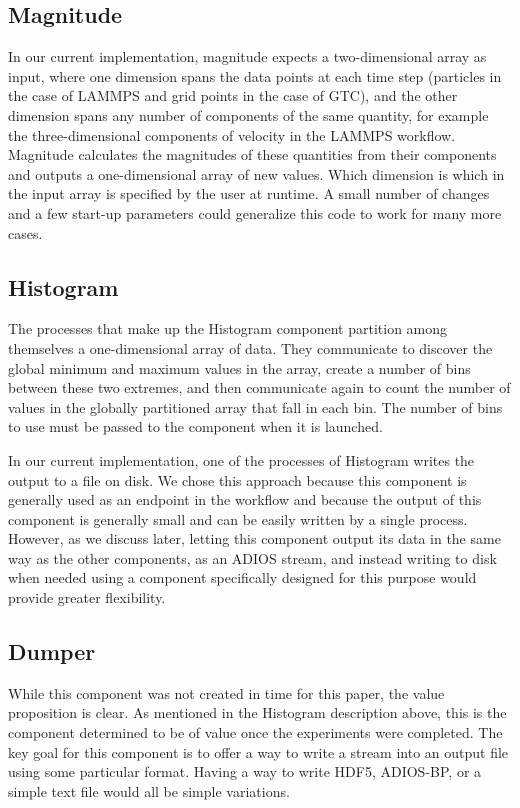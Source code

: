 \documentclass[conference]{IEEEtran}
\begin{document}
\subsection{Magnitude}

In our current implementation, magnitude expects a two-dimensional array as
input, where one dimension spans the data points at each time step (particles
in the case of LAMMPS and grid points in the case of GTC), and the other
dimension spans any number of components of the same quantity, for example the
three-dimensional components of velocity in the LAMMPS workflow. Magnitude
calculates the magnitudes of these quantities from their components and outputs
a one-dimensional array of new values. Which dimension is which in the input
array is specified by the user at runtime. A small number of changes and a few
start-up parameters could generalize this code to work for many more cases.

\subsection{Histogram}

The processes that make up the Histogram component partition among themselves
a one-dimensional array of data. They communicate to discover the global
minimum and maximum values in the array, create a number of bins between these
two extremes, and then communicate again to count the number of values in the
globally partitioned array that fall in each bin. The number of bins to use
must be passed to the component when it is launched.

In our current implementation, one of the processes of Histogram writes the
output to a file on disk. We chose this approach because this component is
generally used as an endpoint in the workflow and because the output of this
component is generally small and can be easily written by a single process.
However, as we discuss later, letting this component output its data in the
same way as the other components, as an ADIOS stream, and instead writing to
disk when needed using a component specifically designed for this purpose would
provide greater flexibility.

\subsection{Dumper}

While this component was not created in time for this paper, the value
proposition is clear. As mentioned in the Histogram description above, this is
the component determined to be of value once the experiments were completed.
The key goal for this component is to offer a way to write a stream into an
output file using some particular format. Having a way to write HDF5, ADIOS-BP,
or a simple text file would all be simple variations.
\end{document}
